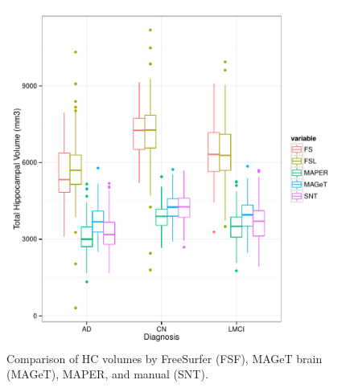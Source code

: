 \documentclass{article}\usepackage{graphicx, color}
\makeatletter
\def\maxwidth{ %
  \ifdim\Gin@nat@width>\linewidth
    \linewidth
  \else
    \Gin@nat@width
  \fi
}
\newenvironment{kframe}{%
 \def\at@end@of@kframe{}%
 \ifinner\ifhmode%
  \def\at@end@of@kframe{\end{minipage}}%
  \begin{minipage}{\columnwidth}%
 \fi\fi%
 \def\FrameCommand##1{\hskip\@totalleftmargin \hskip-\fboxsep
 \colorbox{shadecolor}{##1}\hskip-\fboxsep
     \hskip-\linewidth \hskip-\@totalleftmargin \hskip\columnwidth}%
 \MakeFramed {\advance\hsize-\width
   \@totalleftmargin\z@ \linewidth\hsize
   \@setminipage}}%
 {\par\unskip\endMakeFramed%
 \at@end@of@kframe}
\newenvironment{knitrout}{}{} %
\newcommand{\todo}[1]{\begin{kframe}{\textcolor{red}{TODO #1}}\end{kframe}}
\makeatother
\begin{document}
\todo{Kappa against our manual rater is low}




\begin{figure}[h]
\begin{knitrout}
\color{fgcolor}

{\centering \includegraphics[width=\maxwidth]{figure/ADNI-baseline-volumes-boxplot} 

}


\end{knitrout}

  \caption{Comparison of HC volumes by FreeSurfer (FSF), MAGeT brain (MAGeT), MAPER, and manual (SNT).}
  \label{ADNI-baseline-volumes-boxplot}
\end{figure}
\end{document}

